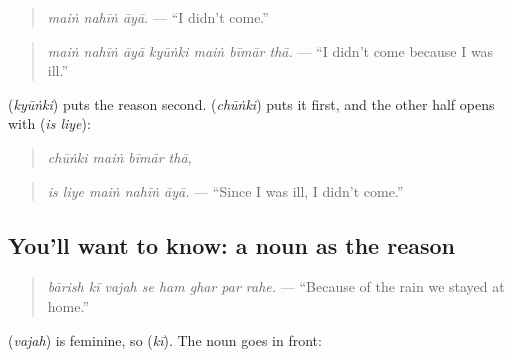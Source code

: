 \begin{quote}
\emph{maiṅ nahīṅ āyā.} — \textquotedblleft{}I didn't come.\textquotedblright{}
\end{quote}

\begin{quote}
\textbf{      }
\end{quote}

\begin{quote}
\emph{maiṅ nahīṅ āyā kyūṅki maiṅ bīmār thā.} — \textquotedblleft{}I didn't come because I was ill.\textquotedblright{}
\end{quote}

\textbf{} (\emph{kyūṅki}) puts the reason second. \textbf{} (\emph{chūṅki}) puts it first, and the other half opens with \textbf{ } (\emph{is liye}):

\begin{quote}
\textbf{   }
\end{quote}

\begin{quote}
\emph{chūṅki maiṅ bīmār thā,}
\end{quote}

\begin{quote}
\textbf{    }
\end{quote}

\begin{quote}
\emph{is liye maiṅ nahīṅ āyā.} — \textquotedblleft{}Since I was ill, I didn't come.\textquotedblright{}
\end{quote}

\subsection*{You'll want to know: a noun as the reason}
\begin{quote}
\textbf{       }
\end{quote}

\begin{quote}
\emph{bārish kī vajah se ham ghar par rahe.} — \textquotedblleft{}Because of the rain we stayed at home.\textquotedblright{}
\end{quote}

\textbf{} (\emph{vajah}) is feminine, so \textbf{} (\emph{kī}). The noun goes in front:


